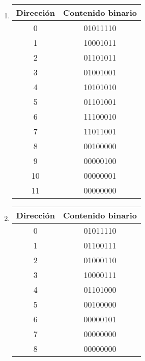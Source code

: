 \documentclass[12pt]{article}
\begin{document}
\begin{enumerate}
\begin{enumerate}
            \item \begin{tabular}{| c | c |}
                    \hline
                    \textbf{Dirección}&\textbf{Contenido binario}\\
                    \hline \hline
                    0 & 01011110\\ \hline
                    1 & 10001011\\ \hline
                    2 & 01101011\\ \hline
                    3 & 01001001\\ \hline
                    4 & 10101010\\ \hline
                    5 & 01101001\\ \hline
                    6 & 11100010\\ \hline
                    7 & 11011001\\ \hline
                    8 & 00100000\\ \hline
                    9 & 00000100\\ \hline
                    10 & 00000001\\ \hline
                    11 & 00000000\\ \hline
            \end{tabular}

            \item \begin{tabular}{| c | c |}
                    \hline
                    \textbf{Dirección}&\textbf{Contenido binario}\\
                    \hline \hline
                    0 & 01011110\\ \hline
                    1 & 01100111\\ \hline
                    2 & 01000110\\ \hline
                    3 & 10000111\\ \hline
                    4 & 01101000\\ \hline
                    5 & 00100000\\ \hline
                    6 & 00000101\\ \hline
                    7 & 00000000\\ \hline
                    8 & 00000000\\ \hline
            \end{tabular}
        \end{enumerate}

\end{enumerate}
\end{document}
